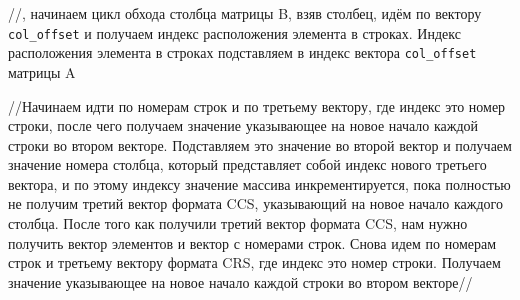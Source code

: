 \documentclass[14pt,a4paper,report]{ncc}
\begin{document}
	
	
	
	
	
	//, начинаем цикл обхода столбца матрицы B, взяв столбец, идём по вектору \verb|col_offset| и получаем индекс расположения элемента в строках. Индекс расположения элемента в строках подставляем в индекс вектора \verb|col_offset| матрицы A
	
	
	
	
	
	
	
	//Начинаем идти по номерам строк и по третьему вектору, где индекс это номер строки, после чего получаем значение указывающее на новое начало каждой строки во втором векторе. Подставляем это значение во второй вектор и получаем значение номера столбца, который представляет собой индекс нового третьего вектора, и по этому индексу значение массива инкрементируется, пока полностью не получим третий вектор формата CCS, указывающий на новое начало каждого столбца. После того как получили третий вектор формата CCS, нам нужно получить вектор элементов и вектор с номерами строк. Снова идем по номерам строк и третьему вектору формата CRS, где индекс это номер строки. Получаем значение указывающее на новое начало каждой строки во втором векторе//
	
	
	
	
\end{document}
